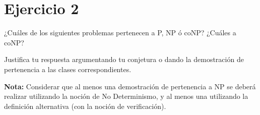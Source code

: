 \section{Ejercicio 2}

\begin{tcolorbox}[enunciado]
¿Cuáles de los siguientes problemas pertenecen a P, NP ó coNP? ¿Cuáles a coNP?

Justifica tu respuesta argumentando tu conjetura o dando la demostración de pertenencia a las clases correspondientes.

\textbf{Nota:} Considerar que al menos una demostración de pertenencia a NP se deberá realizar utilizando la noción de No Determinismo, y al menos una utilizando la definición alternativa (con la noción de verificación).
\end{tcolorbox}

